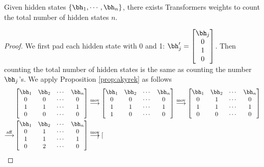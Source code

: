 \begin{cor}\label{cor:count}
    Given hidden states $\{\bh_1, \cdots, \bh_n\}$, there exists Transformers weights to count the total number of hidden states $n$. 
\end{cor}
\begin{proof}
    We first pad each hidden state with 0 and 1: $
        \bh_j' = \begin{bmatrix}
            \bh_j \\ 0 \\ 1 \\ 0
        \end{bmatrix}
    $. Then counting the total number of hidden states is the same as counting the number $\bh_j$'s. We apply Proposition \ref{prop:akyrek} as follows
\begin{equation}
\begin{aligned}
    & \begin{bmatrix}
        \bh_1 & \bh_2 & \cdots & \bh_n \\
        0 & 0 & \cdots & 0 \\
        1 & 1 & \cdots & 1 \\
        0 & 0 & \cdots & 0 
    \end{bmatrix} 
    \overset{\mathrm{mov}}{\longrightarrow} \begin{bmatrix}
        \bh_1 & \bh_2 & \cdots &  \bh_n \\
        0 & 0 & \cdots & 0 \\
        1 & 1 & \cdots & 1 \\
        1 & 0 & \cdots & 0 
    \end{bmatrix}  \overset{\mathrm{mov}}{\longrightarrow} \begin{bmatrix}
        \bh_1 & \bh_2 & \cdots &  \bh_n \\
        0 & 1 & \cdots & 0 \\
        1 & 1 & \cdots & 1 \\
        0 & 0 & \cdots & 0 
    \end{bmatrix} \\
    \overset{\mathrm{aff}}{\longrightarrow} & \begin{bmatrix}
        \bh_1 & \bh_2 & \cdots &  \bh_n \\
        0 & 1 & \cdots & 0 \\
        1 & 1 & \cdots & 1 \\
        0 & 2 & \cdots & 0 
    \end{bmatrix} \overset{\mathrm{mov}}{\longrightarrow} \begin{bmatrix}

\end{bmatrix}
\end{aligned}
\end{equation}
\end{proof}

